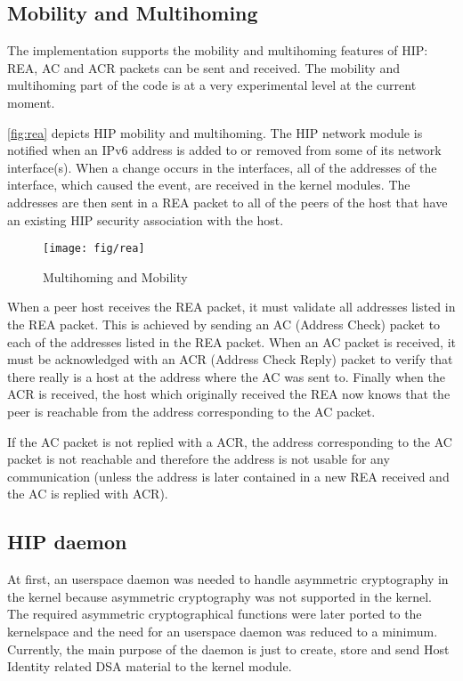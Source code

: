 \subsection{Mobility and Multihoming}
\label{sec:mobility_and_multihoming_architecture}

The implementation supports the mobility and multihoming features of
HIP: REA, AC and ACR packets can be sent and received. The mobility
and multihoming part of the code is at a very experimental level at
the current moment.

\autoref{fig:rea} depicts HIP mobility and multihoming. The HIP
network module is notified when an IPv6 address is added to or removed
from some of its network interface(s). When a change occurs in the
interfaces, all of the addresses of the interface, which caused the
event, are received in the kernel modules. The addresses are then sent
in a REA packet to all of the peers of the host that have an existing
HIP security association with the host.

\begin{figure}[hbt]
 \centering
 \texttt{[image: fig/rea]}
 \caption{Multihoming and Mobility}
 \label{fig:rea}
\end{figure}

When a peer host receives the REA packet, it must validate all
addresses listed in the REA packet. This is achieved by sending an AC
(Address Check) packet to each of the addresses listed in the REA
packet. When an AC packet is received, it must be acknowledged with an
ACR (Address Check Reply) packet to verify that there really is a host
at the address where the AC was sent to. Finally when the ACR is
received, the host which originally received the REA now knows that
the peer is reachable from the address corresponding to the AC packet.

If the AC packet is not replied with a ACR, the address corresponding
to the AC packet is not reachable and therefore the address is not
usable for any communication (unless the address is later contained in
a new REA received and the AC is replied with ACR).

\subsection{HIP daemon}
\label{sec:daemon_architecture}

At first, an userspace daemon was needed to handle asymmetric
cryptography in the kernel because asymmetric cryptography was not
supported in the kernel. The required asymmetric cryptographical
functions were later ported to the kernelspace and the need for an
userspace daemon was reduced to a minimum. Currently, the main purpose
of the daemon is just to create, store and send Host Identity related
DSA material to the kernel module.

